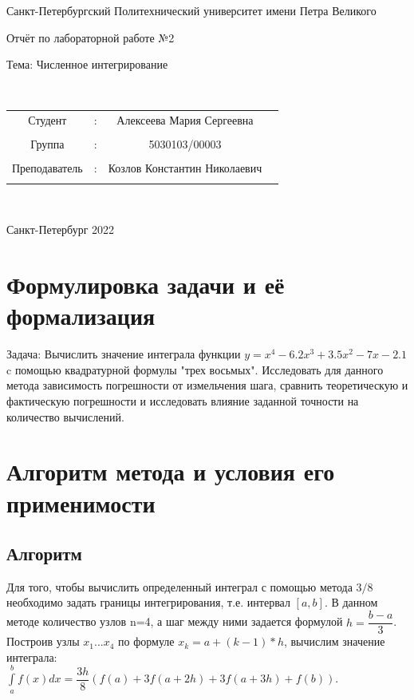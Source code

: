 \documentclass[a4paper]{article}
\begin{document}
\begin{center} 
\hfill \break 
\large{Санкт-Петербургский Политехнический университет имени Петра Великого}\\ 
 
 \hfill \break 
\hfill\break 
\hfill \break 
\hfill \break 
\hfill \break 
\begin{center}\large{Отчёт по лабораторной работе №2} \end{center}  
\hfill \break 
\large{Тема: Численное интегрирование } 
\hfill \break 
\hfill \break 
 
\hfill \break 
\hfill \break 
\\ 
\hfill \break 
\hfill \break 
\end{center} 


\normalsize{ 
\begin{tabular}{cccc} 
Студент & : & Алексеева Мария Сергеевна\\\\ 
Группа & : & 5030103/00003 \\\\ 
Преподаватель & : & Козлов Константин Николаевич \\\\ 
\end{tabular} 
}\\ 
\hfill \break 
\hfill \break 
\hfill \break 
\begin{center} Санкт-Петербург 2022 \end{center} 
\thispagestyle{empty} %
 
\newpage 
	
\section{Формулировка задачи и её формализация} 
Задача: Вычислить значение интеграла функции $y = x^4-6.2x^3+3.5x^2-7x-2.1$ c помощью квадратурной формулы "трех восьмых". Исследовать для данного метода зависимость погрешности от измельчения шага, сравнить теоретическую и фактическую погрешности и исследовать влияние заданной точности на количество вычислений.
\section{Алгоритм метода и условия его применимости} 
\subsection{Алгоритм}
Для того, чтобы вычислить определенный интеграл с помощью метода $3/8$ необходимо задать границы интегрирования, т.е. интервал $[a,b]$. В данном методе количество узлов n=4, а шаг между ними задается формулой $h=\dfrac{b-a}{3}$. Построив узлы $x_1...x_4$ по формуле $x_k=a+(k-1)*h$, вычислим значение интеграла:\\
 $ \int\limits_a^b f(x)dx= \dfrac{3h}{8}(f(a)+3f(a+2h)+3f(a+3h)+f(b))$.
\end{document}
